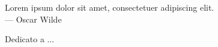 \cleardoublepage
{}
\thispagestyle{empty}

\vspace*{3cm}
\begin{center}
    Lorem ipsum dolor sit amet, consectetuer adipiscing elit. \\ \medskip
    --- Oscar Wilde
\end{center}

\medskip

\begin{center}
    Dedicato a ...
\end{center}
